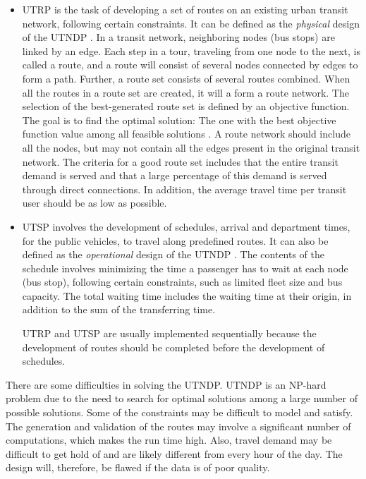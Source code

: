 \begin{itemize}
\item UTRP is the task of developing a set of routes on an existing urban transit network, following certain constraints. It can be defined as the \textit{physical} design of the UTNDP \citep{fan09}. In a transit network, neighboring nodes (bus stops) are linked by an edge. Each step in a tour, traveling from one node to the next, is called a route, and a route will consist of several nodes connected by edges to form a path. Further, a route set consists of several routes combined. When all the routes in a route set are created, it will a form a route network. The selection of the best-generated route set is defined by an objective function. The goal is to find the optimal solution: The one with the best objective function value among all feasible solutions \citep{vehiclerouting}. A route network should include all the nodes, but may not contain all the edges present in the original transit network. The criteria for a good route set includes that the entire transit demand is served and that a large percentage of this demand is served through direct connections. In addition, the average travel time per transit user should be as low as possible. 

\item UTSP involves the development of schedules, arrival and department times, for the public vehicles, to travel along predefined routes. It can also be defined as the \textit{operational} design of the UTNDP \citep{fan09}. 
The contents of the schedule involves minimizing the time a passenger has to wait at each node (bus stop), following certain constraints, such as limited fleet size and bus capacity.  The total waiting time includes the waiting time at their origin, in addition to the sum of the transferring time.

UTRP and UTSP are usually implemented sequentially because the development of routes should be completed before the development of schedules. 
\end{itemize}

There are some difficulties in solving the UTNDP. UTNDP is an NP-hard problem due to the need to search for optimal solutions among a large number of possible solutions. Some of the constraints may be difficult to model and satisfy. The generation and validation of the routes may involve a significant number of computations, which makes the run time high. Also, travel demand may be difficult to get hold of and are likely different from every hour of the day. The design will, therefore, be flawed if the data is of poor quality.   

